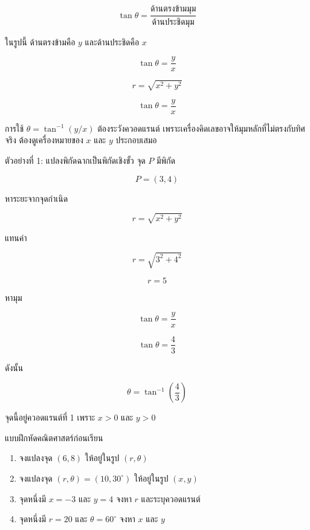\[
\tan\theta=\frac{\text{ด้านตรงข้ามมุม}}{\text{ด้านประชิดมุม}}
\]

ในรูปนี้ ด้านตรงข้ามคือ $y$ และด้านประชิดคือ $x$

\[
\tan\theta=\frac{y}{x}
\]

\begin{tcolorbox}[title={สูตรแปลงพิกัดฉากเป็นพิกัดเชิงขั้ว}]
\[
r=\sqrt{x^2+y^2}
\]

\[
\tan\theta=\frac{y}{x}
\]
\end{tcolorbox}

\begin{tcolorbox}[title=จุดที่นักเรียนมักพลาด]
การใช้ $\theta=\tan^{-1}(y/x)$ ต้องระวังควอดแรนต์ เพราะเครื่องคิดเลขอาจให้มุมหลักที่ไม่ตรงกับทิศจริง ต้องดูเครื่องหมายของ $x$ และ $y$ ประกอบเสมอ
\end{tcolorbox}

\begin{examplebox}{ตัวอย่างที่ 1: แปลงพิกัดฉากเป็นพิกัดเชิงขั้ว}
จุด $P$ มีพิกัด

\[
P=(3,4)
\]

หาระยะจากจุดกำเนิด

\[
r=\sqrt{x^2+y^2}
\]

แทนค่า

\[
r=\sqrt{3^2+4^2}
\]

\[
r=5
\]

หามุม

\[
\tan\theta=\frac{y}{x}
\]

\[
\tan\theta=\frac{4}{3}
\]

ดังนั้น

\[
\theta=\tan^{-1}\left(\frac{4}{3}\right)
\]

จุดนี้อยู่ควอดแรนต์ที่ 1 เพราะ $x>0$ และ $y>0$
\end{examplebox}

\begin{exercisebox}{แบบฝึกหัดคณิตศาสตร์ก่อนเรียน}
\begin{enumerate}
    \item จงแปลงจุด $(6,8)$ ให้อยู่ในรูป $(r,\theta)$
    \item จงแปลงจุด $(r,\theta)=(10,30^\circ)$ ให้อยู่ในรูป $(x,y)$
    \item จุดหนึ่งมี $x=-3$ และ $y=4$ จงหา $r$ และระบุควอดแรนต์
    \item จุดหนึ่งมี $r=20$ และ $\theta=60^\circ$ จงหา $x$ และ $y$
\end{enumerate}
\end{exercisebox}

